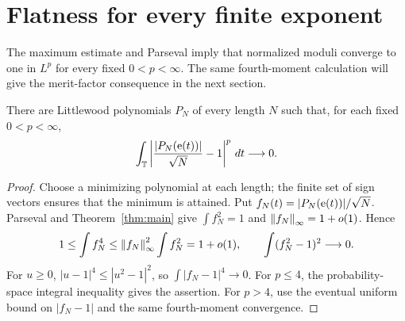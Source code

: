 \section{Flatness for every finite exponent}\label{sec:finite-flatness}
The maximum estimate and Parseval imply that normalized moduli converge
to one in $L^p$ for every fixed $0<p<\infty$. The same fourth-moment calculation
will give the merit-factor consequence in the next section.

\begin{corollary}\label{cor:finite-flatness}
There are Littlewood polynomials $P_N$ of every length $N$ such that,
for each fixed $0<p<\infty$,
\[
 \int_{\mathbb T}\left|\frac{|P_N(\mathrm e(t))|}{\sqrt N}-1\right|^p\,dt
 \longrightarrow0.
\]
\end{corollary}
\begin{proof}
Choose a minimizing polynomial at each length; the finite set of sign
vectors ensures that the minimum is attained. Put
$f_N(t)=|P_N(\mathrm e(t))|/\sqrt N$. Parseval and
Theorem~\ref{thm:main} give $\int f_N^2=1$ and
$\left\lVert f_N\right\rVert_\infty=1+o(1)$. Hence
\[
 1\le\int f_N^4\le\left\lVert f_N\right\rVert_\infty^2\int f_N^2=1+o(1),
 \qquad \int(f_N^2-1)^2\longrightarrow0.
\]
For $u\ge0$, $|u-1|^4\le|u^2-1|^2$, so
$\int|f_N-1|^4\to0$. For $p\le4$, the probability-space integral
inequality gives the assertion. For $p>4$, use the eventual uniform
bound on $|f_N-1|$ and the same fourth-moment convergence.
\end{proof}
